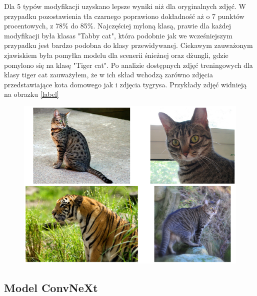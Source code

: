 Dla 5 typów modyfikacji uzyskano lepsze wyniki niż dla oryginalnych zdjęć. W przypadku pozostawienia tła czarnego poprawiono dokładność aż o 7 punktów procentowych, z 78\% do 85\%. Najczęściej myloną klasą, prawie dla każdej modyfikacji była klasas "Tabby cat", która podobnie jak
we wcześniejszym przypadku jest bardzo podobna do klasy przewidywanej. Ciekawym zauważonym zjawiskiem była pomyłka modelu dla scenerii śnieżnej oraz dżungli, gdzie pomylono się na klasę "Tiger cat". Po analizie dostępnych zdjęć treningowych dla klasy tiger cat zauważyłem, że w ich skład 
wchodzą zarówno zdjęcia przedstawiające kota domowego jak i zdjęcia tygrysa. Przykłady zdjęć widnieją na obrazku \ref*{label}

\begin{figure}
	\centering\includegraphics[width=.9\textwidth]{img/285}
	\caption{}
	\label{rys:285}
\end{figure}

\subsection*{Model ConvNeXt}


